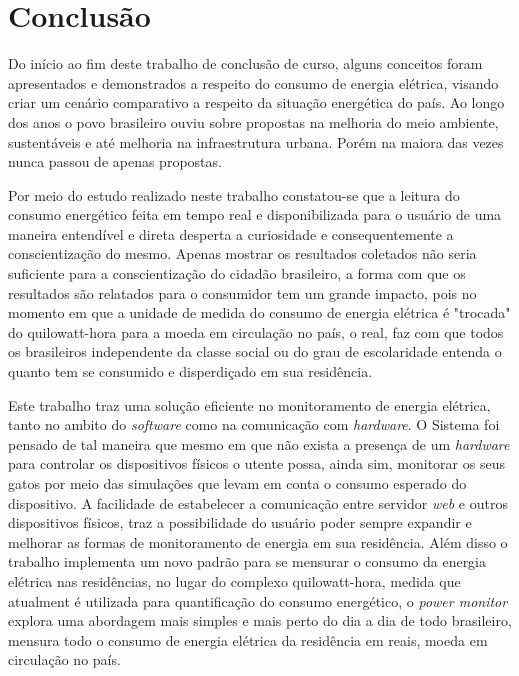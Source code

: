 \chapter[Conclusão]{Conclusão}
\label{ch:conclusao-cap}

Do início ao fim deste trabalho de conclusão de curso, alguns conceitos foram apresentados
e demonstrados a respeito do consumo de energia elétrica, visando criar um cenário
comparativo a respeito da situação energética do país. Ao longo dos anos o povo brasileiro
ouviu sobre propostas na melhoria do meio ambiente, sustentáveis e até
melhoria na infraestrutura urbana. Porém na maiora das vezes nunca passou de apenas propostas.

Por meio do estudo realizado neste trabalho constatou-se que a leitura do
consumo energético feita em tempo real e disponibilizada para o usuário de uma maneira entendível e direta
desperta a curiosidade e consequentemente a conscientização do mesmo. Apenas mostrar os resultados coletados não seria suficiente
para a conscientização do cidadão brasileiro, a forma com que os resultados são relatados para o consumidor tem um grande impacto, pois
no momento em que a unidade de medida do consumo de energia elétrica é "trocada" do quilowatt-hora para a moeda em circulação no país, o real, 
faz com que todos os brasileiros independente da classe social ou do grau de escolaridade entenda o quanto tem se consumido e disperdiçado em sua residência.

Este trabalho traz uma solução eficiente no monitoramento de energia elétrica, tanto no ambito do \textit{software} como na comunicação com 
\textit{hardware}. O Sistema foi pensado de tal maneira que mesmo em que não exista a presença de um \textit{hardware} para controlar os dispositivos físicos
o utente possa, ainda sim, monitorar os seus gatos por meio das simulações que levam em conta o consumo esperado do dispositivo. A facilidade de estabelecer 
a comunicação entre servidor \textit{web} e outros dispositivos físicos, traz a possibilidade do usuário poder sempre expandir e melhorar as formas
de monitoramento de energia em sua residência. Além disso o trabalho implementa um novo padrão para se mensurar o consumo da energia elétrica nas
residências, no lugar do complexo quilowatt-hora, medida que atualment é utilizada para quantificação do consumo energético, o \textit{power monitor}
explora uma abordagem mais simples e mais perto do dia a dia de todo brasileiro, mensura todo o consumo de energia elétrica da residência em 
reais, moeda em circulação no país. 

